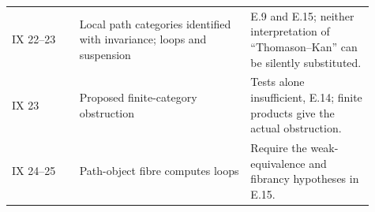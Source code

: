 \begin{center}
\begin{longtable}{L{0.17\linewidth}L{0.43\linewidth}L{0.31\linewidth}}
IX 22--23 & Local path categories identified with invariance; loops and suspension & E.9 and E.15; neither interpretation of ``Thomason--Kan'' can be silently substituted.\\
IX 23 & Proposed finite-category obstruction & Tests alone insufficient, E.14; finite products give the actual obstruction.\\
IX 24--25 & Path-object fibre computes loops & Require the weak-equivalence and fibrancy hypotheses in E.15.\\
\bottomrule
\end{longtable}
\end{center}





